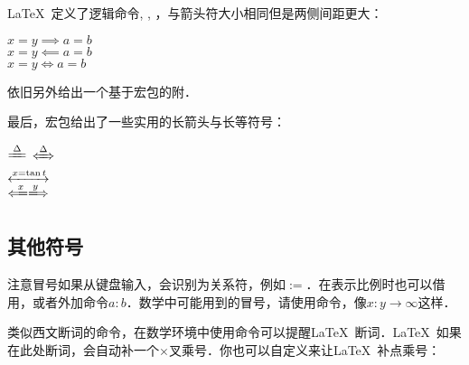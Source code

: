 \LaTeX\ 定义了逻辑命令, , ，与箭头符大小相同但是两侧间距更大：
\begin{codeshow}
$x=y \implies a=b$\\
$x=y \impliedby a=b$\\
$x=y \iff a=b$
\end{codeshow}

依旧另外给出一个基于宏包的附．
\begin{table}[!htb]
\centering
\caption{amssymb箭头}
\label{tab:amsarrow}
\renewcommand\arraystretch{1}
\end{table}

最后，宏包给出了一些实用的长箭头与长等符号：

\begin{codeshow}
$\xlongequal{\Delta}$\quad
$\xLeftrightarrow{\Delta}$\\
$\xleftrightarrow{x=\tan t}$\\
$\xLongleftarrow{x} \xLongrightarrow{y}$
\end{codeshow}

\subsection{其他符号}
注意冒号如果从键盘输入，会识别为关系符，例如$:=$．在表示比例时也可以借用，或者外加命令$a\mathbin{:}b$．数学中可能用到的冒号，请使用命令，像$x\colon y\to\infty$这样．

类似西文断词的\latexline{-}命令，在数学环境中使用\latexline{*}命令可以提醒\LaTeX\ 断词．\LaTeX\ 如果在此处断词，会自动补一个$\times$叉乘号．你也可以自定义来让\LaTeX\ 补点乘号：
\begin{latex}
\renewcommand{\*}{\discretionary{\,\mbox{$\cdot$}}{}{}}
\end{latex}

